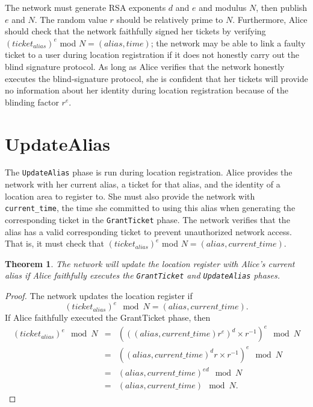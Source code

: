 \documentclass[11pt]{article}
\newtheorem{theorem}{Theorem}
\begin{document}
The network must generate RSA exponents $d$ and $e$ and modulus $N$, then publish $e$ and $N$. The random value $r$ should be relatively prime to $N$. Furthermore, Alice should check that the network faithfully signed her tickets by verifying $(ticket_{alias})^e$ mod $N = (alias, time)$; the network may be able to link a faulty ticket to a user during location registration if it does not honestly carry out the blind signature protocol. As long as Alice verifies that the network honestly executes the blind-signature protocol, she is confident that her tickets will provide no information about her identity during location registration because of the blinding factor $r^e$.

\section{UpdateAlias}
The \texttt{UpdateAlias} phase is run during location registration. Alice provides the network with her current alias, a ticket for that alias, and the identity of a location area to register to. She must also provide the network with \texttt{current_time}, the time she committed to using this alias when generating the corresponding ticket in the \texttt{GrantTicket} phase. The network verifies that the alias has a valid corresponding ticket to prevent unauthorized network access. That is, it must check that $(ticket_{alias})^e$ mod $N = (alias, current\_time)$.


\begin{theorem}
	The network will update the location register with Alice's current alias if Alice faithfully executes the \emph{\texttt{GrantTicket}} and \emph{\texttt{UpdateAlias}} phases.
\end{theorem}
\begin{proof}
The network updates the location register if 
\begin{equation*}
	(ticket_{alias})^e \mod N = (alias, current\_time).
\end{equation*}
If Alice faithfully executed the GrantTicket phase, then
\begin{eqnarray*}
	(ticket_{alias})^e \mod N & = & (((alias,current\_time)r^e)^d \times r^{-1})^e \mod N \\
	& = & ((alias,current\_time)^dr \times r^{-1})^e \mod N \\
	& = & (alias,current\_time)^{ed} \mod N \\
	& = & (alias, current\_time) \mod N.
\end{eqnarray*}
\end{proof}
\end{document}
